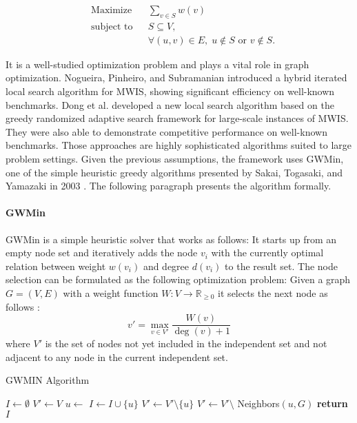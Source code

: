 \begin{equation}
    \begin{aligned}
        & \text{Maximize}
        & & \sum_{v \in S} w(v) \\
        & \text{subject to}
        & & S \subseteq V, \\
        &&& \forall (u, v) \in E, \; u \notin S \text{ or } v \notin S.
    \end{aligned}\label{eq:mwis}
\end{equation}

It is a well-studied optimization problem and plays a vital role in graph optimization.
Nogueira, Pinheiro, and Subramanian \cite{Nogueira2018A} introduced a hybrid iterated local search algorithm for MWIS, showing significant efficiency on well-known benchmarks.
Dong et al. \cite{Dong2022A} developed a new local search algorithm based on the greedy randomized adaptive search framework for large-scale instances of MWIS.
They were also able to demonstrate competitive performance on well-known benchmarks.
Those approaches are highly sophisticated algorithms suited to large problem settings.
Given the previous assumptions, the framework uses GWMin, one of the simple heuristic greedy algorithms presented by Sakai, Togasaki, and Yamazaki in 2003 \cite{SAKAI2003313}.
The following paragraph presents the algorithm formally.

\paragraph{GWMin}
GWMin is a simple heuristic solver that works as follows:
It starts up from an empty node set
and iteratively adds the node $v_i$ with the currently optimal relation between weight $w(v_i)$ and degree $d(v_i)$ to the result set.
The node selection can be formulated as the following optimization problem:
Given a graph $G = (V, E)$ with a weight function $W: V \to \mathbb{R}_{\geq 0}$ it selects the next node as follows :
\[
    v' = \max_{v \in V'} \frac{W(v)}{\deg(v) + 1}
\]
where $V'$ is the set of nodes not yet included in the independent set and not adjacent to any node in the current independent set.


\begin{algorithm}
    \caption{GWMIN Algorithm}
    \begin{algorithmic}[1]
            \State $I \gets \emptyset$ 
            \State $V' \gets V$ 
                \State $u \gets$ 
                \State $I \gets I \cup \{u\}$ 
                \State $V' \gets V' \setminus \{u\}$ 
                \State $V' \gets V' \setminus$ Neighbors$(u, G)$ 
            \EndWhile
            \State \textbf{return} $I$
        \EndProcedure
    \end{algorithmic}\label{alg:algorithm-gwmin}
\end{algorithm}

